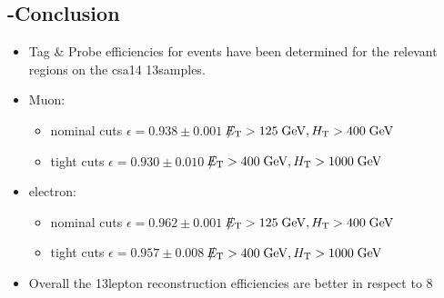 \documentclass{beamer}
\begin{document}

\subsection{\Zll -Conclusion}
\begin{frame}
 \begin{itemize}
  \item Tag \& Probe efficiencies for \Zll events have been determined for the relevant regions on the csa14 13\tev samples. 
  \item Muon:
  \begin{itemize}
  \item nominal cuts $\epsilon = 0.938 \pm 0.001$ $\slash\mkern-12mu{E}_{\text{T}} > 125 \;\text{Ge}\kern-0.06667em\text{V}, H_{\text{T}} > 400 \;\text{Ge}\kern-0.06667em\text{V} $
   \item tight cuts  $\epsilon = 0.930 \pm 0.010$ $\slash\mkern-12mu{E}_{\text{T}} > 400 \;\text{Ge}\kern-0.06667em\text{V}, H_{\text{T}} > 1000 \;\text{Ge}\kern-0.06667em\text{V} $
  \end{itemize}
  \item electron:
  \begin{itemize}
  \item nominal cuts $\epsilon = 0.962 \pm0.001$ $\slash\mkern-12mu{E}_{\text{T}} > 125 \;\text{Ge}\kern-0.06667em\text{V}, H_{\text{T}} > 400 \;\text{Ge}\kern-0.06667em\text{V} $
   \item tight cuts  $\epsilon = 0.957 \pm 0.008$ $\slash\mkern-12mu{E}_{\text{T}} > 400 \;\text{Ge}\kern-0.06667em\text{V}, H_{\text{T}} > 1000 \;\text{Ge}\kern-0.06667em\text{V} $
  \end{itemize}
  \item Overall the 13\tev lepton reconstruction efficiencies are better in respect to 8\tev 
 \end{itemize}

\end{frame}

\end{document}
